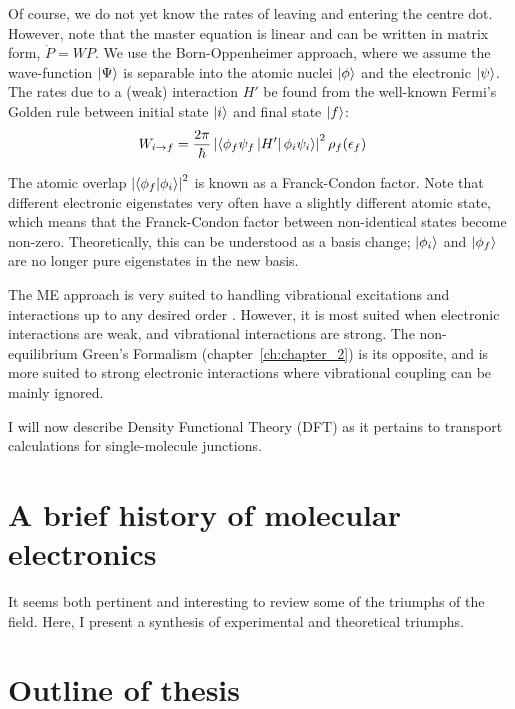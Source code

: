 Of course, we do not yet know the rates of leaving and entering the centre dot. However, note that the master equation is linear and can be written in matrix form, $\dot{P} = W P$. We use the Born-Oppenheimer approach, where we assume the wave-function $\ket{\Psi}$ is separable into the atomic nuclei $\ket{\phi}$ and the electronic $\ket{\psi}$. The rates due to a (weak) interaction $H'$ be found from the well-known Fermi's Golden rule between initial state $\ket{i}$ and final state $\ket{f}$:
\begin{align*}
W_{i\rightarrow f} &= \frac{2\pi}{\hbar} \left| \braket{\phi_f \psi_f \left|H'\right| \phi_i \psi_i}\right|^2 \rho_f (\epsilon_f)
\end{align*}

The atomic overlap $\left| \braket{ \phi_f | \phi_i }\right|^2$ is known as a Franck-Condon factor. Note that different electronic eigenstates very often have a slightly different atomic state, which means that the Franck-Condon factor between non-identical states become non-zero. Theoretically, this can be understood as a basis change; $\ket{\phi_i}$ and $\ket{\phi_f}$ are no longer pure eigenstates in the new basis. 

The ME approach is very suited to handling vibrational excitations and interactions up to any desired order \cite{seldenthuis}. However, it is most suited when electronic interactions are weak, and vibrational interactions are strong. The non-equilibrium Green's Formalism (chapter~\ref{ch:chapter_2}) is its opposite, and is more suited to strong electronic interactions where vibrational coupling can be mainly ignored. 

I will now describe Density Functional Theory (DFT) as it pertains to transport calculations for single-molecule junctions. 


\section{A brief history of molecular electronics}
It seems both pertinent and interesting to review some of the triumphs of the field. Here, I present a synthesis of experimental and theoretical triumphs.


\section{Outline of thesis}
